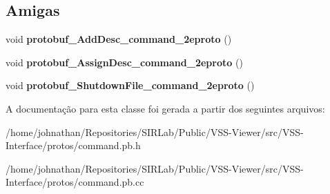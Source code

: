 \subsection*{Amigas}
\begin{DoxyCompactItemize}
\item 
void {\bfseries protobuf\+\_\+\+Add\+Desc\+\_\+command\+\_\+2eproto} ()\hypertarget{classvss__command_1_1Robot__Command_a4825d92f856fcb4b02c67b601c433796}{}\label{classvss__command_1_1Robot__Command_a4825d92f856fcb4b02c67b601c433796}

\item 
void {\bfseries protobuf\+\_\+\+Assign\+Desc\+\_\+command\+\_\+2eproto} ()\hypertarget{classvss__command_1_1Robot__Command_a4c6fb97c25079d49daf010087d869100}{}\label{classvss__command_1_1Robot__Command_a4c6fb97c25079d49daf010087d869100}

\item 
void {\bfseries protobuf\+\_\+\+Shutdown\+File\+\_\+command\+\_\+2eproto} ()\hypertarget{classvss__command_1_1Robot__Command_a4cf10633ad46690f5eec6bdbbcf62de0}{}\label{classvss__command_1_1Robot__Command_a4cf10633ad46690f5eec6bdbbcf62de0}

\end{DoxyCompactItemize}


A documentação para esta classe foi gerada a partir dos seguintes arquivos\+:\begin{DoxyCompactItemize}
\item 
/home/johnathan/\+Repositories/\+S\+I\+R\+Lab/\+Public/\+V\+S\+S-\/\+Viewer/src/\+V\+S\+S-\/\+Interface/protos/command.\+pb.\+h\item 
/home/johnathan/\+Repositories/\+S\+I\+R\+Lab/\+Public/\+V\+S\+S-\/\+Viewer/src/\+V\+S\+S-\/\+Interface/protos/command.\+pb.\+cc\end{DoxyCompactItemize}
